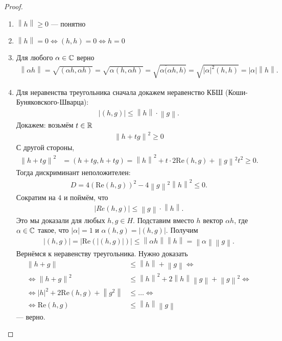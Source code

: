 \begin{proof}\
 \begin{enumerate}
  \item $\left\| h \right\| \geqslant 0$ --- понятно
  \item $\left\| h \right\| = 0 \iff (h, h) = 0 \iff h = 0$
  \item Для любого $\alpha \in \mathbb{C}$ верно \begin{align*}
    \left\| \alpha h \right\| = \sqrt{(\alpha h, \alpha h)} = \sqrt{\alpha (h, \alpha h)} = \sqrt{\alpha \overline({\alpha h, h})} = \sqrt{ \left| \alpha \right|^{2} (h, h) } = \left| \alpha \right| \left\| h \right\|
  .\end{align*} 
 \item Для неравенства треугольника сначала докажем неравенство КБШ (Коши-Буняковского-Шварца): \begin{align*}
  \left| (h, g) \right| \leqslant \left\| h \right\| \cdot \left\| g \right\|
 .\end{align*} Докажем: возьмём $t \in \mathbb{R}$ \begin{align*}
  \left\| h + tg \right\|^{2} \geqslant 0
 \end{align*} С другой стороны, \begin{align*}
 \left\| h + tg \right\|^{2} &= (h + tg, h + tg) = \left\| h \right\|^{2} + t \cdot 2\mathrm{Re}(h, g) + \left\| g \right\|^{2}t^{2} \geqslant 0
 .\end{align*} Тогда дискриминант неположителен: \begin{align*}
 D = 4(\mathrm{Re}(h, g))^{2} - 4 \left\| g \right\|^{2} \left\| h \right\|^{2} \leqslant 0
 .\end{align*} Сократим на $4$ и поймём, что \begin{align*}
  \left| Re(h, g) \right| \leqslant \left\| g \right\| \cdot \left\| h \right\|
 .\end{align*} Это мы доказали для любых $h, g \in H$. Подставим вместо $h$ вектор $\alpha h$, где $\alpha \in \mathbb{C}$ такое, что $\left| \alpha \right| = 1$ и $\alpha (h, g) = \left| (h, g) \right|$. Получим \begin{align*}
 \left| (h, g) \right| = \left| \mathrm{Re}(\left| (h, g) \right|) \right| \leqslant \left\| \alpha h \right\| \left\| h \right\| = \left\| \alpha \right\| \left\| g \right\|
 .\end{align*} Вернёмся к неравенству треугольника. Нужно доказать \begin{align*}
 \left\| h + g \right\| &\leqslant \left\| h \right\| + \left\| g \right\| \iff \\
 \iff \left\| h + g \right\|^{2} &\leqslant \left\| h \right\|^{2} + 2 \left\| h \right\| \left\| g \right\| +  \left\| g \right\|^{2} \iff \\
 \iff \left| h \right|^{2} + 2\mathrm{Re}(h, g) + \left\| g^{2} \right\| &\leqslant \ldots \iff \\
 \iff \mathrm{Re}(h, g) &\leqslant \left\| h \right\| \left\| g \right\|
 \end{align*} --- верно.
 \end{enumerate}
\end{proof}
